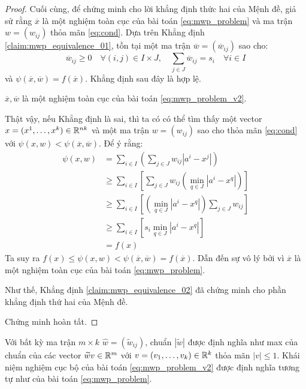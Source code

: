 \documentclass[a4paper]{report}
\begin{document}
\begin{proof}
        Cuối cùng, để chứng minh cho lời khẳng định thức hai của Mệnh đề, giả sử rằng $\overline{x}$ là một nghiệm toàn cục của bài toán \eqref{eq:mwp_problem} và ma trận $w = (w_{ij})$ thỏa mãn \eqref{eq:cond}. Dựa trên Khẳng định \ref{claim:mwp_equivalence_01}, tồn tại một ma trận $\overline{w} = (\overline{w}_{ij})$ sao cho:
        \begin{equation}
            \label{eq:inequality_claim:mwp_equivalence_01}
            \overline{w}_{ij} \geq 0\quad \forall (i, j) \in I \times J, \quad \sum_{j \in J}\overline{w}_{ij} = s_i\quad\forall i \in I
        \end{equation}
        và $\psi(\overline{x}, \overline{w}) = f(\overline{x})$. Khẳng định sau đây là hợp lệ.
        \begin{claim}
            \label{claim:mwp_equivalence_02}
            $\overline{x}, \overline{w}$ là một nghiệm toàn cục của bài toán \eqref{eq:mwp_problem_v2}.
        \end{claim}
        Thật vậy, nếu Khẳng định là sai, thì ta có có thể tìm thấy một vector $x = (x^1, \dots, x^k) \in \mathbb{R}^{nk}$ và một ma trận $w = (w_{ij})$ sao cho thỏa mãn \eqref{eq:cond} với $\psi(x, w) < \psi(\overline{x}, \overline{w})$. Để ý rằng:
        \begin{align}
            \psi(x, w) &= \sum_{i \in I}\left(\sum_{j \in J}w_{ij}\left|a^i - x^j\right|\right) \\ 
            &\geq \sum_{i \in I}\left[\sum_{j \in J}w_{ij}\left(\min_{q \in J}\left|a^i - x^q\right|\right)\right] \\ 
            &\geq \sum_{i \in I}\left[\left(\min_{q \in J}\left|a^i - x^q\right|\right)\sum_{j \in J}w_{ij}\right] \\ 
            &\geq \sum_{i \in I}\left[s_i\min_{q \in J}\left|a^i - x^q\right|\right] \\ 
            &= f(x)
        \end{align}
        Ta suy ra $f(x) \leq \psi(x, w) < \psi(\overline{x}, \overline{w}) = f(\overline{x})$. Dẫn đến sự vô lý bởi vì $\overline{x}$ là một nghiệm toàn cục của bài toán \eqref{eq:mwp_problem}.

        Như thế, Khẳng định \ref{claim:mwp_equivalence_02} đã chứng minh cho phần khẳng định thứ hai của Mệnh đề.

        Chứng minh hoàn tất.
    \end{proof}

    Với bất kỳ ma trận $m \times k$ $\widehat{w} = (\widetilde{w}_{ij})$, chuẩn $\left|\widetilde{w}\right|$ được định nghĩa như max của chuẩn của các vector $\widetilde{w}v \in \mathbb{R}^{m}$ với $v = (v_1, \dots, v_k) \in \mathbb{R}^{k}$ thỏa mãn $\left|v\right| \leq 1$. Khái niệm nghiệm cục bộ của bài toán \eqref{eq:mwp_problem_v2} được định nghĩa tương tự như của bài toán \eqref{eq:mwp_problem}.
\end{document}
